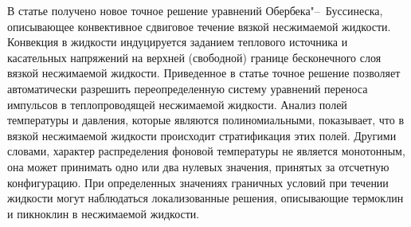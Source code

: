 











%




%




В статье получено новое точное решение уравнений Обербе\-ка"--~Буссинеска, описывающее конвективное сдвиговое течение вязкой несжимаемой жидкости. Конвекция в жидкости индуцируется заданием теплового источника и касательных напряжений на верхней (свободной) границе бесконечного слоя вязкой не\-сжимаемой жидкости. Приведенное в статье точное решение позволяет автоматически разрешить переопределенную систему уравнений переноса импульсов в теплопроводящей несжимаемой жидкости. Анализ полей температуры и давления, которые являются полиномиальными, показывает, что в вязкой несжимаемой жидкости происходит стратификация этих полей. Другими словами, характер распределения фоновой температуры не является монотонным, она может принимать одно или два нулевых значения, принятых за отсчетную конфигурацию. При определенных значениях граничных условий при течении жидкости могут наблюдаться локализованные решения, описывающие термоклин и пикноклин в несжимаемой жидкости.











